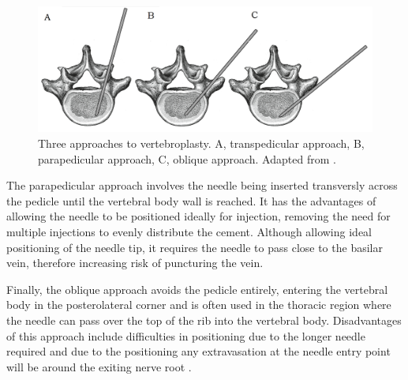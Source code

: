 \begin{figure}[hbt]
\centering

  \includegraphics[width=14cm]{images/Vertebroplasty_approach.png}
  \caption{Three approaches to vertebroplasty. A, transpedicular approach, B,
parapedicular approach, C, oblique approach. Adapted from \cite{Gray1918}.}
\label{fig:vpapproach}
\end{figure}



The parapedicular approach involves the needle being inserted transversly across the pedicle until the
vertebral body wall is reached. It has the advantages of allowing the
needle to be positioned ideally for injection, removing the need for
multiple injections to evenly distribute the cement. Although allowing
ideal positioning of the needle tip, it requires the needle to pass
close to the basilar vein, therefore increasing risk of puncturing the
vein.

Finally, the oblique approach avoids the pedicle entirely, entering the
vertebral body in the posterolateral corner and is often used in the
thoracic region where the needle can pass over the top of the rib into
the vertebral body. Disadvantages of this approach include difficulties
in positioning due to the longer needle required and due to the
positioning any extravasation at the needle entry point will be around
the exiting nerve root \cite{pope2014musculoskeletal}.



